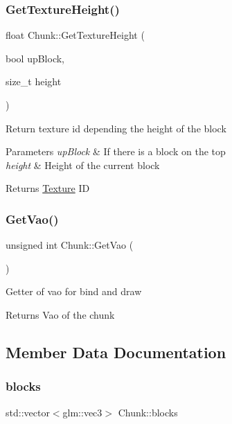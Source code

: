 \subsubsection{\texorpdfstring{Get\+Texture\+Height()}{GetTextureHeight()}}
{\footnotesize\ttfamily float Chunk\+::\+Get\+Texture\+Height (\begin{DoxyParamCaption}\item[{bool}]{up\+Block,  }\item[{size\+\_\+t}]{height }\end{DoxyParamCaption})}



Return texture id depending the height of the block 


\begin{DoxyParams}{Parameters}
{\em up\+Block} & If there is a block on the top\\
\hline
{\em height} & Height of the current block\\
\hline
\end{DoxyParams}
\begin{DoxyReturn}{Returns}
\mbox{\hyperlink{class_texture}{Texture}} ID
\end{DoxyReturn}
\mbox{\label{class_chunk_abb8569de26bbdf9f72aa692821cce21b}} 
\subsubsection{\texorpdfstring{Get\+Vao()}{GetVao()}}
{\footnotesize\ttfamily unsigned int Chunk\+::\+Get\+Vao (\begin{DoxyParamCaption}{ }\end{DoxyParamCaption})}



Getter of vao for bind and draw 

\begin{DoxyReturn}{Returns}
Vao of the chunk
\end{DoxyReturn}


\subsection{Member Data Documentation}
\mbox{\label{class_chunk_a82c2f083263b7f764ca5682a2e676ad7}} 
\subsubsection{\texorpdfstring{blocks}{blocks}}
{\footnotesize\ttfamily std\+::vector$<$glm\+::vec3$>$ Chunk\+::blocks}

